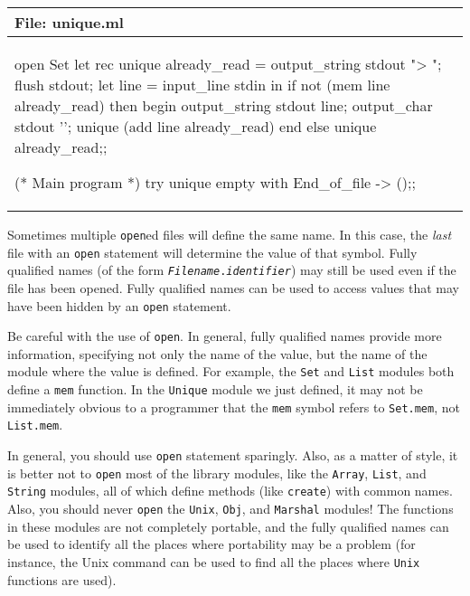 \begin{center}
\begin{tabular}[t]{l}
File: unique.ml\\
\hline
\begin{ocaml}
open Set
let rec unique already_read =
   output_string stdout "> ";
   flush stdout;
   let line = input_line stdin in
      if not (mem line already_read) then begin
         output_string stdout line;
         output_char stdout '\n';
         unique (add line already_read)
      end else
         unique already_read;;

(* Main program *)
try unique empty with
   End_of_file ->
      ();;
\end{ocaml}
\end{tabular}
\end{center}
%
Sometimes multiple \texttt{open}ed files will define the same name. In
this case, the \emph{last} file with an \texttt{open} statement will
determine the value of that symbol. Fully qualified names (of the
form \texttt{\emph{Filename}.\emph{identifier}}) may still be used even if
the file has been opened. Fully qualified names can be used to access
values that may have been hidden by an \texttt{open} statement.


Be careful with the use of \texttt{open}. In general, fully qualified
names provide more information, specifying not only the name of the
value, but the name of the module where the value is defined. For
example, the \texttt{Set} and \texttt{List} modules both define
a \texttt{mem} function. In the \texttt{Unique} module we just
defined, it may not be immediately obvious to a programmer that
the \texttt{mem} symbol refers to \hbox{\lstinline/Set.mem/},
not \hbox{\lstinline/List.mem/}.

In general, you should use \hbox{\lstinline/open/} statement
sparingly. Also, as a matter of style, it is better not
to \texttt{open} most of the library modules, like
the \hbox{\lstinline/Array/}, \hbox{\lstinline/List/},
and \hbox{\lstinline/String/} modules, all of which define methods
(like \hbox{\lstinline/create/}) with common names. Also, you should
never \texttt{open}
the \hbox{\lstinline/Unix/}, \hbox{\lstinline/Obj/},
and \hbox{\lstinline/Marshal/} modules! The functions in these modules
are not completely portable, and the fully qualified names can be used
to identify all the places where portability may be a problem (for
instance, the Unix  command can be used to find all the
places where \hbox{\lstinline/Unix/} functions are used).

